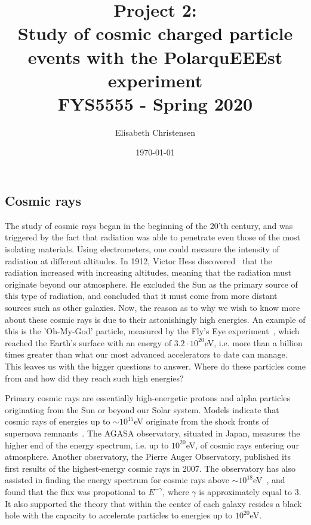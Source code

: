 \documentclass[12pt,a4paper]{amsart}
\title[Charged particles study with PolarquEEEst]{Project 2: \\Study of cosmic charged particle events with the PolarquEEEst experiment\\
\small{\mdseries FYS5555 - Spring 2020}}
\date{\today}
\author[Christensen]{Elisabeth Christensen}
\begin{document}
\maketitle
\setcounter{section}{1}
\setcounter{subsection}{0}
\subsection{Cosmic rays}
The study of cosmic rays began in the beginning of the 20'th century, and was triggered by the fact that radiation was able to penetrate even those of the most isolating materials. Using electrometers, one could measure the intensity of radiation at different altitudes. In 1912, Victor Hess discovered~\cite{Hess1912} that the radiation increased with increasing altitudes, meaning that the radiation must originate beyond our atmosphere. He excluded the Sun as the primary source of this type of radiation, and concluded that it must come from more distant sources such as other galaxies. Now, the reason as to why we wish to know more about these cosmic rays is due to their astonishingly high energies. An example of this is the 'Oh-My-God' particle, measured by the Fly's Eye experiment~\cite{OhMyGodParticle}, which reached the Earth's surface with an energy of $3.2\cdot 10^{20}$eV, i.e. more than a billion times greater than what our most advanced accelerators to date can manage. This leaves us with the bigger questions to answer. Where do these particles come from and how did they reach such high energies?

Primary cosmic rays are essentially high-energetic protons and alpha particles originating from the Sun or beyond our Solar system. Models indicate that cosmic rays of energies up to $\sim 10^{15}$eV originate from the shock fronts of supernova remnants~\cite{Ellison1997}. The AGASA observatory, situated in Japan, measures the higher end of the energy spectrum, i.e. up to $10^{20}$eV, of cosmic rays entering our atmosphere. Another observatory, the Pierre Auger Observatory, published its first results of the highest-energy cosmic rays in 2007. The observatory has also assisted in finding the energy spectrum for cosmic rays above $\sim 10^{18}$eV~\cite{Auger2010}, and found that the flux was propotional to $E^{-\gamma}$, where $\gamma$ is approximately equal to 3. It also supported the theory that within the center of each galaxy resides a black hole with the capacity to accelerate particles to energies up to $10^{20}$eV.
\end{document}
